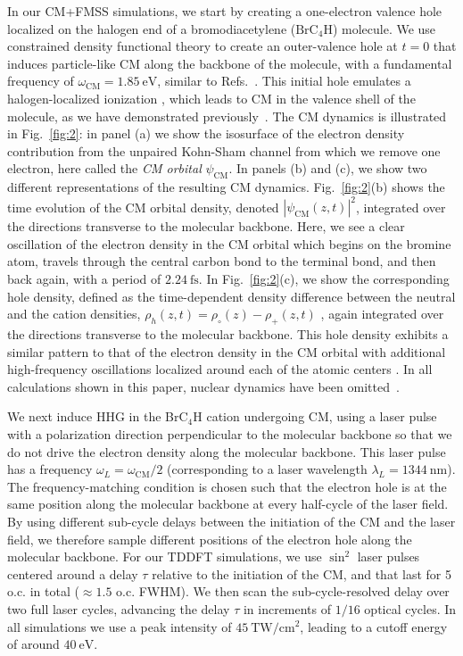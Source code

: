 \documentclass[journal=jacsat,manuscript=article]{achemso}
\begin{document}
\noindent In our CM+FMSS simulations, we start by creating a one-electron valence hole localized on the halogen end of a bromodiacetylene ($\text{BrC}_{4}\text{H}$) molecule. We use constrained density functional theory to create an outer-valence hole at $t=0$ that induces particle-like CM along the backbone of the molecule, with a fundamental frequency of $\omega_{\text{CM}} = 1.85\  \text{eV}$, similar to Refs.~\cite{folorunso2021, hamer2022}. This initial hole emulates a halogen-localized ionization \cite{sandor2019, barillot2022}, which leads to CM in the valence shell of the molecule, as we have demonstrated previously~\cite{bruner2017, folorunso2021, mauger2022, hamer2022}. The CM dynamics is illustrated in Fig.~{\ref{fig:2}}: in panel (a) we show the isosurface of the electron density contribution from the unpaired Kohn-Sham channel from which we remove one electron, here called the \emph{CM orbital} $\psi_{\text{CM}}$. In panels (b) and (c), we show two different representations of the resulting CM dynamics. Fig.~{\ref{fig:2}}(b) shows the time evolution of the CM orbital density, denoted $|\psi_{\text{CM}}(z, t)|^{2}$, integrated over the directions transverse to the molecular backbone. Here, we see a clear oscillation of the electron density in the CM orbital which begins on the bromine atom, travels through the central carbon bond to the terminal bond, and then back again, with a period of $2.24\ \text{fs}$. In Fig.~{\ref{fig:2}}(c), we show the corresponding hole density, defined as the time-dependent density difference between the neutral and the cation densities, $\rho_{h}(z, t) = \rho_{\circ}(z) - \rho_{+}(z, t)$ \cite{cederbaum1999, breidbach2003, folorunso2021}, again integrated over the directions transverse to the molecular backbone. This hole density exhibits a similar pattern to that of the electron density in the CM orbital with additional high-frequency oscillations localized around each of the atomic centers \cite{mauger2022}. In all calculations shown in this paper, nuclear dynamics have been omitted~\cite{footnote1}.

We next induce HHG in the BrC$_{4}$H cation undergoing CM, using a laser pulse with a polarization direction perpendicular to the molecular backbone so that we do not drive the electron density along the molecular backbone. This laser pulse has a frequency $\omega_{L} = \omega_{\text{CM}}/2$ (corresponding to a laser wavelength $\lambda_{L} = 1344\ \text{nm}$). The frequency-matching condition is chosen such that the electron hole is at the same position along the molecular backbone at every half-cycle of the laser field. By using different sub-cycle delays between the initiation of the CM and the laser field, we therefore sample different positions of the electron hole along the molecular backbone. For our TDDFT simulations, we use $\sin^{2}$ laser pulses centered around a delay $\tau$ relative to the initiation of the CM, and that last for 5 o.c. in total ($\approx 1.5$ o.c. FWHM). We then scan the sub-cycle-resolved delay over two full laser cycles, advancing the delay $\tau$ in increments of $1/16$ optical cycles. In all simulations we use a peak intensity of $45\ \text{TW}/\text{cm}^{2}$, leading to a cutoff energy of around $40\ \text{eV}$.
\end{document}
